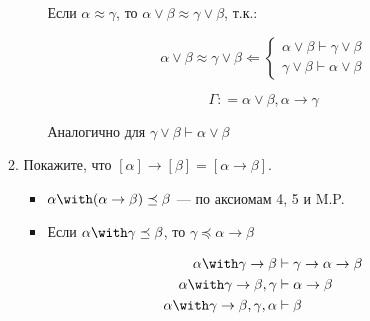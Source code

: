 \begin{enumerate}
\begin{enumerate}[wide, labelwidth=!, labelindent=0pt]
\begin{itemize}
                              Если \(\alpha \approx \gamma\), то \(\alpha \lor \beta \approx \gamma \lor \beta\), т.к.:

                              \[\alpha \lor \beta \approx \gamma \lor \beta \Leftarrow \begin{cases}
                                      \alpha \lor \beta \vdash \gamma \lor \beta \\
                                      \gamma \lor \beta \vdash \alpha \lor \beta
                                  \end{cases}\]

                              \[\Gamma : = \alpha \lor \beta, \alpha \to \gamma\]

                              \begin{prooftree}
                              \end{prooftree}

                              Аналогично для \(\gamma \lor \beta \vdash \alpha \lor \beta\)
                    \end{itemize}

              \item Покажите, что $[\alpha]\rightarrow[\beta]=[\alpha\rightarrow\beta]$.

                    \begin{itemize}
                        \item \(\alpha \with (\alpha \to \beta) \preceq \beta\) --- по аксиомам 4, 5 и M.P.
                        \item Если \(\alpha \with \gamma \preceq \beta\), то \(\gamma \preceq \alpha \to \beta\)

                              \begin{align*}
                                  \alpha \with \gamma \to \beta                 & \vdash \gamma \to \alpha \to \beta \\
                                  \alpha \with \gamma \to \beta, \gamma         & \vdash \alpha \to \beta            \\
                                  \alpha \with \gamma \to \beta, \gamma, \alpha & \vdash \beta                       \\
                              \end{align*}


\end{itemize}
\end{enumerate}
\end{enumerate}
